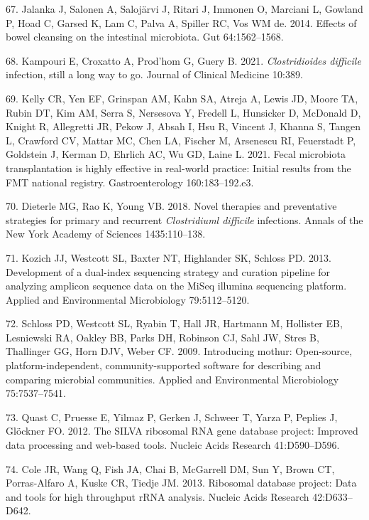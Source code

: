 \documentclass[
  11pt,
]{article}
\begin{document}
\leavevmode\hypertarget{ref-Jalanka2014}{}%
67. Jalanka J, Salonen A, Salojärvi J, Ritari J, Immonen O, Marciani L,
Gowland P, Hoad C, Garsed K, Lam C, Palva A, Spiller RC, Vos WM de.
2014. Effects of bowel cleansing on the intestinal microbiota. Gut
64:1562--1568.

\leavevmode\hypertarget{ref-Kampouri2021}{}%
68. Kampouri E, Croxatto A, Prod'hom G, Guery B. 2021.
\emph{Clostridioides difficile} infection, still a long way to go.
Journal of Clinical Medicine 10:389.

\leavevmode\hypertarget{ref-Kelly2021}{}%
69. Kelly CR, Yen EF, Grinspan AM, Kahn SA, Atreja A, Lewis JD, Moore
TA, Rubin DT, Kim AM, Serra S, Nersesova Y, Fredell L, Hunsicker D,
McDonald D, Knight R, Allegretti JR, Pekow J, Absah I, Hsu R, Vincent J,
Khanna S, Tangen L, Crawford CV, Mattar MC, Chen LA, Fischer M,
Arsenescu RI, Feuerstadt P, Goldstein J, Kerman D, Ehrlich AC, Wu GD,
Laine L. 2021. Fecal microbiota transplantation is highly effective in
real-world practice: Initial results from the FMT national registry.
Gastroenterology 160:183--192.e3.

\leavevmode\hypertarget{ref-Dieterle2018}{}%
70. Dieterle MG, Rao K, Young VB. 2018. Novel therapies and preventative
strategies for primary and recurrent \emph{Clostridiuml difficile}
infections. Annals of the New York Academy of Sciences 1435:110--138.

\leavevmode\hypertarget{ref-Kozich2013}{}%
71. Kozich JJ, Westcott SL, Baxter NT, Highlander SK, Schloss PD. 2013.
Development of a dual-index sequencing strategy and curation pipeline
for analyzing amplicon sequence data on the MiSeq illumina sequencing
platform. Applied and Environmental Microbiology 79:5112--5120.

\leavevmode\hypertarget{ref-Schloss2009}{}%
72. Schloss PD, Westcott SL, Ryabin T, Hall JR, Hartmann M, Hollister
EB, Lesniewski RA, Oakley BB, Parks DH, Robinson CJ, Sahl JW, Stres B,
Thallinger GG, Horn DJV, Weber CF. 2009. Introducing mothur:
Open-source, platform-independent, community-supported software for
describing and comparing microbial communities. Applied and
Environmental Microbiology 75:7537--7541.

\leavevmode\hypertarget{ref-Quast2012}{}%
73. Quast C, Pruesse E, Yilmaz P, Gerken J, Schweer T, Yarza P, Peplies
J, Glöckner FO. 2012. The SILVA ribosomal RNA gene database project:
Improved data processing and web-based tools. Nucleic Acids Research
41:D590--D596.

\leavevmode\hypertarget{ref-Cole2013}{}%
74. Cole JR, Wang Q, Fish JA, Chai B, McGarrell DM, Sun Y, Brown CT,
Porras-Alfaro A, Kuske CR, Tiedje JM. 2013. Ribosomal database project:
Data and tools for high throughput rRNA analysis. Nucleic Acids Research
42:D633--D642.
\end{document}
